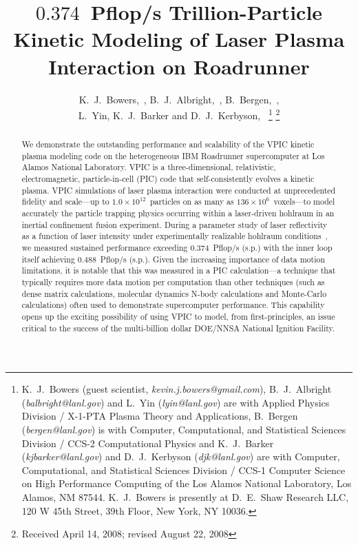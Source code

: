 \documentclass[journal,twoside]{IEEEtran}
\begin{document}
\title{$0.374$~Pflop/s Trillion-Particle Kinetic Modeling of Laser Plasma
Interaction on Roadrunner}

\author{K.~J.~Bowers,~,
        B.~J.~Albright,~,
        B.~Bergen,~, \\
        L.~Yin, %
        K.~J.~Barker %
        and D.~J.~Kerbyson,~%
\thanks{
K.~J.~Bowers (guest scientist, \emph{kevin.j.bowers@gmail.com}),
B.~J.~Albright (\emph{balbright@lanl.gov}) and L.~Yin
(\emph{lyin@lanl.gov}) are with Applied Physics Division / X-1-PTA
Plasma Theory and Applications, B.~Bergen (\emph{bergen@lanl.gov}) is
with Computer, Computational, and Statistical Sciences Division /
CCS-2 Computational Physics and K.~J.~Barker
(\emph{kjbarker@lanl.gov}) and D.~J.~Kerbyson (\emph{djk@lanl.gov})
are with Computer, Computational, and Statistical Sciences Division /
CCS-1 Computer Science on High Performance Computing of the Los Alamos
National Laboratory, Los Alamos, NM 87544.  K.~J.~Bowers is presently
at D.~E.~Shaw Research LLC, 120 W 45th Street, 39th Floor, New York,
NY 10036.}%
\thanks{Received April 14, 2008; revised August 22, 2008}
}


\maketitle

\begin{abstract}
We demonstrate the outstanding performance and scalability of the VPIC
kinetic plasma modeling code on the heterogeneous IBM Roadrunner
supercomputer at Los Alamos National Laboratory.  VPIC is a 
three-dimensional, relativistic, electromagnetic, particle-in-cell (PIC)
code that self-consistently evolves a kinetic plasma.  VPIC
simulations of laser plasma interaction were conducted at
unprecedented fidelity and scale---up to $1.0 \times
10^{12}$~particles on as many as $136 \times 10^6$~voxels---to model
accurately the particle trapping physics occurring within a
laser-driven hohlraum in an inertial confinement fusion experiment.
During a parameter study of laser reflectivity as a function of laser
intensity under experimentally realizable hohlraum
conditions~\cite{AAC_Conference_Paper}, we measured sustained
performance exceeding $0.374$~Pflop/s (s.p.) with the inner loop
itself achieving $0.488$~Pflop/s (s.p.).  Given the increasing
importance of data motion limitations, it is notable that this was
measured in a PIC calculation---a technique that typically requires
more data motion per computation than other techniques (such as dense
matrix calculations, molecular dynamics N-body calculations and
Monte-Carlo calculations) often used to demonstrate supercomputer
performance.  This capability opens up the exciting possibility of
using VPIC to model, from first-principles, an issue critical to the
success of the multi-billion dollar DOE/NNSA National Ignition
Facility.
\end{abstract}
\end{document}
